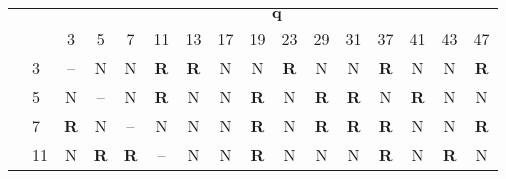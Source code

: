 \documentclass[17pt]{memoir}
\begin{document}
\arrayrulewidth=2pt
\hspace*{-1cm}
\begin{tabular}{@{}l@{\hskip 8mm}l|cccccccccccccc@{}}
                     &                          & \multicolumn{14}{c}{$\boldsymbol{q}$}                                                                                                                                                                                                                                                                                                                                                                                \\[5mm]
                     &                          & 3                         & 5                         & 7                         & 11                        & 13                        & 17                        & 19                        & 23                        & 29                        & 31                        & 37                        & 41                        & 43                        & 47                        \\
\hline
                     & 3                        & --  & N                         & N                         & \textbf{R} & \textbf{R} & N                         & N                         & \textbf{R} & N                         & N                         & \textbf{R} & N                         & N                         & \textbf{R} \\
                     & 5                        & N                         & --  & N                         & \textbf{R} & N                         & N                         & \textbf{R} & N                         & \textbf{R} & \textbf{R} & N                         & \textbf{R} & N                         & N                         \\
                     & 7                        & \textbf{R} & N                         & --  & N                         & N                         & N                         & \textbf{R} & N                         & \textbf{R} & \textbf{R} & \textbf{R} & N                         & N                         & \textbf{R} \\
                     & 11                       & N                         & \textbf{R} & \textbf{R} & --  & N                         & N                         & \textbf{R} & N                         & N                         & N                         & \textbf{R} & N                         & \textbf{R} & N                         \\

\end{tabular}
\end{document}
